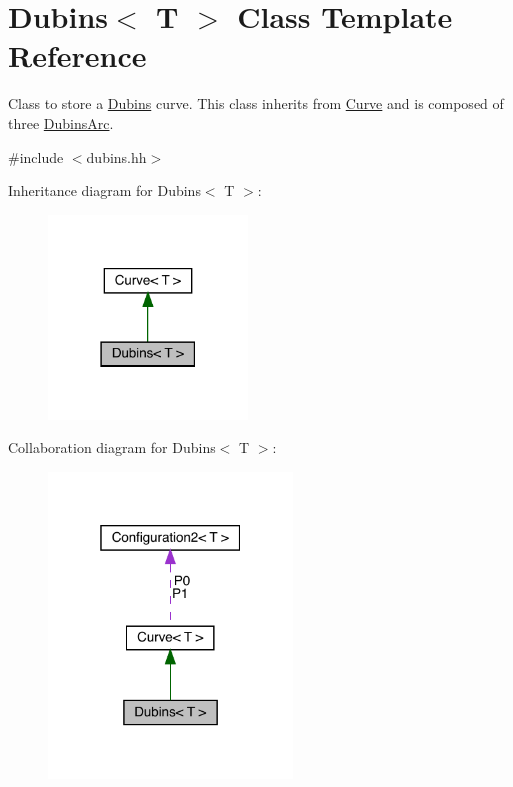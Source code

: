 \hypertarget{class_dubins}{}\section{Dubins$<$ T $>$ Class Template Reference}
\label{class_dubins}


Class to store a \mbox{\hyperlink{class_dubins}{Dubins}} curve. This class inherits from {\ttfamily \mbox{\hyperlink{class_curve}{Curve}}} and is composed of three {\ttfamily \mbox{\hyperlink{class_dubins_arc}{Dubins\+Arc}}}.  




{\ttfamily \#include $<$dubins.\+hh$>$}



Inheritance diagram for Dubins$<$ T $>$\+:
\nopagebreak
\begin{figure}[H]
\begin{center}
\leavevmode
\includegraphics[width=150pt]{class_dubins__inherit__graph}
\end{center}
\end{figure}


Collaboration diagram for Dubins$<$ T $>$\+:
\nopagebreak
\begin{figure}[H]
\begin{center}
\leavevmode
\includegraphics[width=184pt]{class_dubins__coll__graph}
\end{center}
\end{figure}
